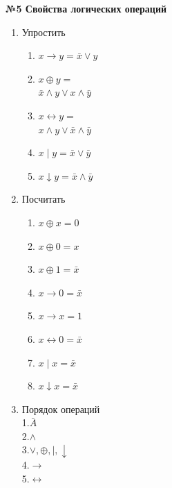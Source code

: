     \begin{center}
        \textbf{№5 Свойства логических операций}
    \end{center}
    \begin{minipage}[t]{0.3\textwidth}
        \centering
        \begin{enumerate}
            \item Упростить
            \begin{enumerate}
                \item $x \rightarrow y = \bar x \vee y$
                \item $x \oplus y = $\\
                $\bar x \wedge y \vee x \wedge \bar y$
                \item $x \leftrightarrow y = $\\
                $x \wedge y \vee \bar x \wedge \bar y$
                \item $x \mid y = \bar x \vee \bar y$
                \item $x \downarrow y = \bar x \wedge \bar y$
            \end{enumerate}
        \end{enumerate}
    \end{minipage}
    \begin{minipage}[t]{0.3\textwidth}
        \centering
        \begin{enumerate}
            \setcounter{enumi}{1}
            \item Посчитать
            \begin{enumerate}
                \item $x \oplus x = 0$
                \item $x \oplus 0 = x$
                \item $x \oplus 1 = \bar x$
                \item $x \rightarrow 0 = \bar x$
                \item $x \rightarrow x = 1$
                \item $x \leftrightarrow 0 = \bar x$
                \item $x \mid x = \bar x$
                \item $x \downarrow x = \bar x$
            \end{enumerate}
        \end{enumerate}
    \end{minipage}
    \begin{minipage}[t]{0.4\textwidth}
        \centering
        \begin{enumerate}
            \setcounter{enumi}{2}
            \item Порядок операций\\
            1.$\bar A$\\
            2.$\wedge$\\
            3.$\vee, \oplus, \mid, \downarrow$\\
            4.$\rightarrow$\\
            5.$\leftrightarrow$\\
        \end{enumerate}
    \end{minipage}
